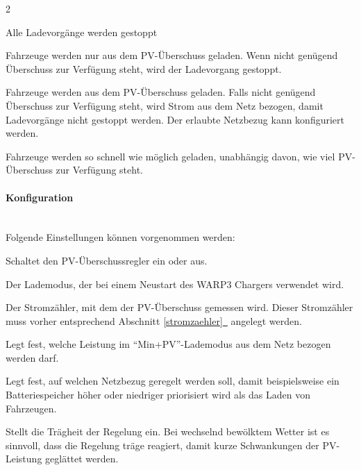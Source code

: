 \documentclass[a4paper,10pt]{article}
\newcommand*{\fullref}[1]{Abschnitt \hyperref[{#1}]{\ref*{#1}~\nameref*{#1}}}
\begin{document}
\begin{multicols*}{2}
	\begin{description}[labelindent=0.5cm, leftmargin=0.5cm]
	 \item[Aus] Alle Ladevorgänge werden gestoppt
	 \item[PV] Fahrzeuge werden nur aus dem PV-Überschuss geladen.
               Wenn nicht genügend Überschuss zur Verfügung steht, wird der Ladevorgang gestoppt.
	 \item[Min+PV] Fahrzeuge werden aus dem PV-Überschuss geladen.
                   Falls nicht genügend Überschuss zur Verfügung steht, wird Strom aus dem Netz bezogen,
                   damit Ladevorgänge nicht gestoppt werden.
                   Der erlaubte Netzbezug kann konfiguriert werden.
     \item[Schnell] Fahrzeuge werden so schnell wie möglich geladen, unabhängig davon, wie viel PV-Überschuss zur Verfügung steht.
	\end{description}


	\paragraph{Konfiguration}\ \\

	Folgende Einstellungen können vorgenommen werden:
	\begin{description}[labelindent=0.5cm, leftmargin=0.5cm]
		\item[Überschussladen aktiviert] Schaltet den PV-Über\-schuss\-regler ein oder aus.
		\item[Standardlademodus] Der Lademodus, der bei einem Neustart des WARP3 Chargers verwendet wird.
		\item[Stromzähler] Der Stromzähler, mit dem der PV-Überschuss gemessen wird. Dieser Stromzähler muss vorher entsprechend \fullref{stromzaehler} angelegt werden.
		\item[Min+PV: Mindestladeleistung] Legt fest, welche Leistung im \enquote{Min+PV}-Lademodus aus dem Netz bezogen werden darf.
		\item[Regelverhalten] Legt fest, auf welchen
		Netzbezug geregelt werden soll, damit beispielsweise ein Batteriespeicher höher oder niedriger priorisiert wird als das Laden von Fahrzeugen.
		\item[Wolkenfilter] Stellt die Trägheit der Regelung
		ein. Bei wechselnd bewölktem Wetter ist es sinnvoll, dass die Regelung
		träge reagiert, damit kurze Schwankungen der PV-Leistung geglättet werden.
	\end{description}


\end{multicols*}
\end{document}
